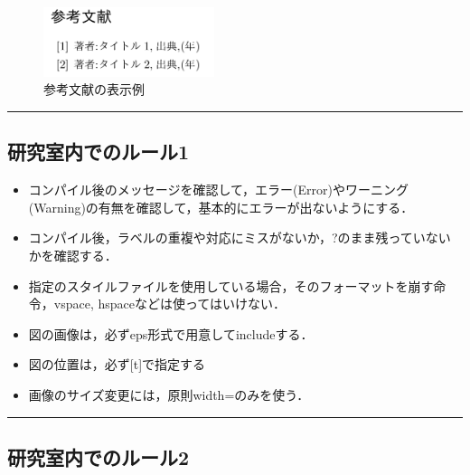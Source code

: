 \begin{figure}[htbp]
\centering
\includegraphics[width=5.00000cm]{./figures/bibref.png}
\caption{参考文献の表示例}
\end{figure}

\begin{center}\rule{0.5\linewidth}{\linethickness}\end{center}

\hypertarget{ux7814ux7a76ux5ba4ux5185ux3067ux306eux30ebux30fcux30eb1}{\subsection{研究室内でのルール1}\label{ux7814ux7a76ux5ba4ux5185ux3067ux306eux30ebux30fcux30eb1}}

\begin{itemize}
\tightlist
\item
  コンパイル後のメッセージを確認して，エラー(Error)やワーニング(Warning)の有無を確認して，基本的にエラーが出ないようにする．
\item
  コンパイル後，ラベルの重複や対応にミスがないか，?のまま残っていないかを確認する．
\item
  指定のスタイルファイルを使用している場合，そのフォーマットを崩す命令，vspace,
  hspaceなどは使ってはいけない．
\item
  図の画像は，必ずeps形式で用意してincludeする．
\item
  図の位置は，必ず{[}t{]}で指定する
\item
  画像のサイズ変更には，原則width=のみを使う．
\end{itemize}

\begin{center}\rule{0.5\linewidth}{\linethickness}\end{center}

\hypertarget{ux7814ux7a76ux5ba4ux5185ux3067ux306eux30ebux30fcux30eb2}{\subsection{研究室内でのルール2}\label{ux7814ux7a76ux5ba4ux5185ux3067ux306eux30ebux30fcux30eb2}}

